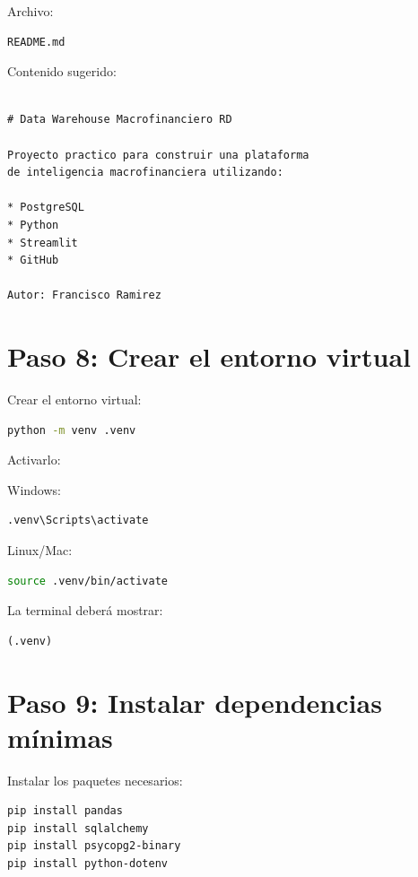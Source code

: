 Archivo:

\begin{verbatim}
README.md
\end{verbatim}

Contenido sugerido:

\begin{lstlisting}

# Data Warehouse Macrofinanciero RD

Proyecto practico para construir una plataforma
de inteligencia macrofinanciera utilizando:

* PostgreSQL
* Python
* Streamlit
* GitHub

Autor: Francisco Ramirez
\end{lstlisting}

\section{Paso 8: Crear el entorno virtual}

Crear el entorno virtual:

\begin{lstlisting}[language=bash]
python -m venv .venv
\end{lstlisting}

Activarlo:

Windows:

\begin{lstlisting}[language=bash]
.venv\Scripts\activate
\end{lstlisting}

Linux/Mac:

\begin{lstlisting}[language=bash]
source .venv/bin/activate
\end{lstlisting}

La terminal deberá mostrar:

\begin{verbatim}
(.venv)
\end{verbatim}

\section{Paso 9: Instalar dependencias mínimas}

Instalar los paquetes necesarios:

\begin{lstlisting}[language=bash]
pip install pandas
pip install sqlalchemy
pip install psycopg2-binary
pip install python-dotenv
\end{lstlisting}

